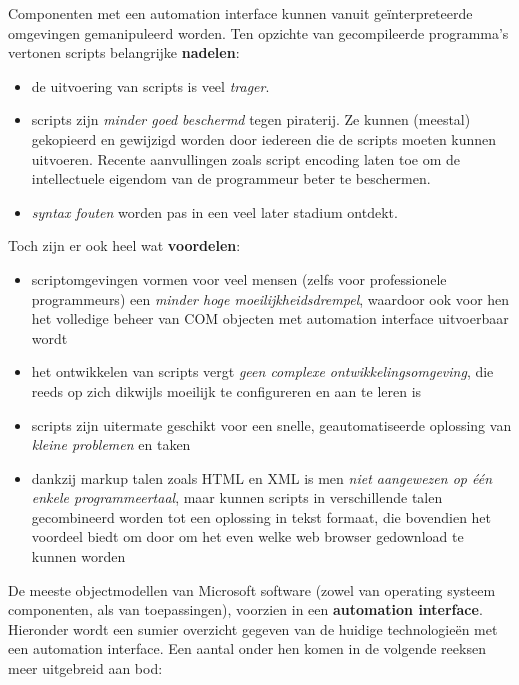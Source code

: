 \documentclass[11pt,a4paper]{report}
\begin{document}
Componenten met een automation interface kunnen vanuit geïnterpreteerde omgevingen gemanipuleerd worden. Ten opzichte van gecompileerde programma's vertonen scripts belangrijke \textbf{nadelen}:
\begin{itemize}
\item de uitvoering van scripts is veel \textit{trager}.
\item scripts zijn \textit{minder goed beschermd} tegen piraterij. Ze kunnen (meestal) gekopieerd en gewijzigd worden door iedereen die de scripts moeten kunnen uitvoeren. Recente aanvullingen zoals script encoding laten toe om de intellectuele eigendom van de programmeur beter te beschermen.
\item \textit{syntax fouten} worden pas in een veel later stadium ontdekt.
\end{itemize}
Toch zijn er ook heel wat \textbf{voordelen}:
\begin{itemize}
\item scriptomgevingen vormen voor veel mensen (zelfs voor professionele programmeurs) een \textit{minder hoge moeilijkheidsdrempel}, waardoor ook voor hen het volledige beheer van COM objecten met automation interface uitvoerbaar wordt
\item het ontwikkelen van scripts vergt \textit{geen complexe ontwikkelingsomgeving}, die reeds op zich dikwijls moeilijk te configureren en aan te leren is
\item scripts zijn uitermate geschikt voor een snelle, geautomatiseerde oplossing van \textit{kleine problemen} en taken
\item dankzij markup talen zoals HTML en XML is men \textit{niet aangewezen op één enkele programmeertaal}, maar kunnen scripts in verschillende talen gecombineerd worden tot een oplossing in tekst formaat, die bovendien het voordeel biedt om door om het even welke web browser gedownload te kunnen worden
\end{itemize}
\par De meeste objectmodellen van Microsoft software (zowel van operating systeem componenten, als van toepassingen), voorzien in een \textbf{automation interface}. Hieronder wordt een sumier overzicht gegeven van de huidige technologieën met een automation interface. Een aantal onder hen komen in de volgende reeksen meer uitgebreid aan bod:
\end{document}
